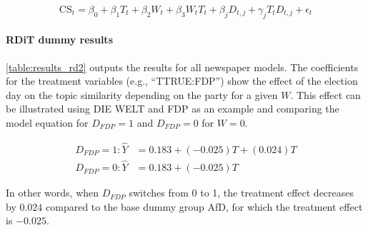 \documentclass[
  12pt,
]{article}
\begin{document}
\[
\text{CS}_{t}=\beta_0+\beta_1T_t+\beta_2W_{t}+\beta_3W_tT_t+\beta_jD_{t,j}+\gamma_jT_tD_{t,j}+ \epsilon_t
\]

\hypertarget{rdit-dummy-results}{%
\paragraph{RDiT dummy results}\label{rdit-dummy-results}}

\autoref{table:results_rd2} outputs the results for all newspaper
models. The coefficients for the treatment variables (e.g.,
``TTRUE:FDP'') show the effect of the election day on the topic
similarity depending on the party for a given \(W\). This effect can be
illustrated using DIE WELT and FDP as an example and comparing the model
equation for \(D_{FDP} = 1\) and \(D_{FDP} = 0\) for \(W=0\).

\[
\begin{aligned}
D_{FDP} = 1: \hat{Y} &=0.183+(-0.025)T+(0.024)T \\
D_{FDP} = 0: \hat{Y} &=0.183+(-0.025)T
\end{aligned}
\]

In other words, when \(D_{FDP}\) switches from 0 to 1, the treatment
effect decreases by \(0.024\) compared to the base dummy group AfD, for
which the treatment effect is \(-0.025\).
\end{document}
